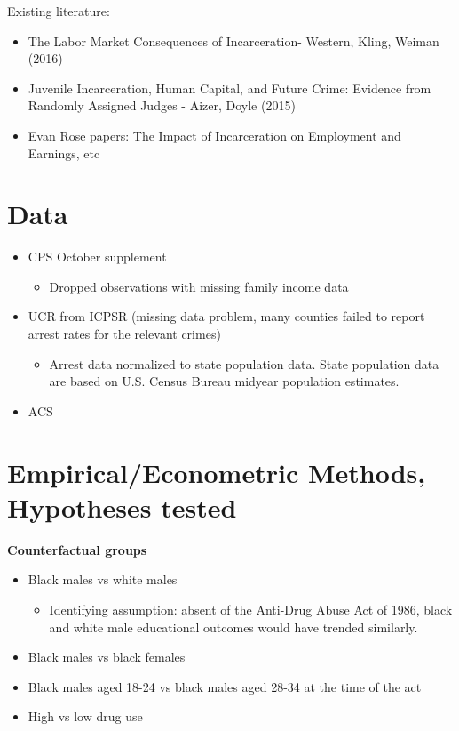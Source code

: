 \documentclass{article}
\begin{document}
Existing literature:
\begin{itemize}[itemsep=0.05mm, parsep=0pt]
  \item The Labor Market Consequences of Incarceration- Western, Kling, Weiman (2016)
  \item Juvenile Incarceration, Human Capital, and Future Crime: Evidence from Randomly Assigned Judges - Aizer, Doyle (2015)
  \item Evan Rose papers: The Impact of Incarceration on Employment and Earnings, etc
\end{itemize}


\section*{Data}

\begin{itemize}[itemsep=0.05mm, parsep=0pt]
  \item CPS October supplement
  \begin{itemize}
    \item Dropped observations with missing family income data
  \end{itemize}
  \item UCR from ICPSR (missing data problem, many counties failed to report arrest rates for the relevant crimes)
  \begin{itemize}
    \item Arrest data normalized to state population data. State population data are based on U.S. Census Bureau midyear population estimates.
  \end{itemize}
  \item ACS
\end{itemize}

\section*{Empirical/Econometric Methods, Hypotheses tested}

\textbf{Counterfactual groups}
\begin{itemize}[itemsep=0.05mm, parsep=0pt]
  \item Black males vs white males
  \begin{itemize}
    \item Identifying assumption: absent of the Anti-Drug Abuse Act of 1986, black and white male educational outcomes would have trended similarly.
  \end{itemize}
  \item Black males vs black females
  \item Black males aged 18-24 vs black males aged 28-34 at the time of the act
  \item High vs low drug use
\end{itemize}
\end{document}
